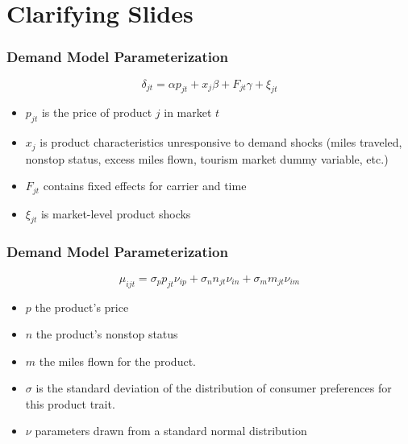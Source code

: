 \documentclass[xcolor=dvipsnames]{beamer}
\begin{document}
    \printbibliography
%	
\appendix
    \section{Clarifying Slides}
        \begin{frame}[noframenumbering, label = {Full_Parameterization}]
        \frametitle{Demand Model Parameterization} 
        \[\delta_{jt} = \alpha p_{jt} + x_{j} \beta + F_{jt}\gamma  +  \xi_{jt}\]
         \vspace{-8mm}
        \begin{itemize}
            \item $p_{jt}$ is the price of product $j$ in market $t$
            \item $x_j$ is product characteristics unresponsive to demand shocks (miles traveled, nonstop status, excess miles flown, tourism market dummy variable, etc.)
            \item $F_{jt}$ contains fixed effects for carrier and time
            \item $\xi_{jt}$ is market-level product shocks
        \end{itemize}
    \end{frame}

    \begin{frame}[noframenumbering]
        \frametitle{Demand Model Parameterization}
             \[\mu_{ijt} = \sigma_{p} p_{jt} \nu_{ip} + \sigma_{n} n_{jt} \nu_{in} + \sigma_{m} m_{jt} \nu_{im} \] 
             \vspace{-8mm}
            \begin{itemize}
                \item $p$ the product's price
                \item $n$ the product's nonstop status
                \item $m$ the miles flown for the product.
                \item $\sigma$ is the standard deviation of the distribution of consumer preferences for this product trait. 
                \item $\nu$ parameters drawn from a standard normal distribution 
            \end{itemize}
    \hyperlink{Demand_Overview}{}

    \end{frame}
\end{document}
